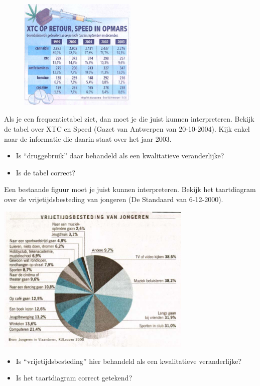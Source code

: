 \documentclass[12pt,twoside]{article}
\begin{document}
\begin{figure}
  \vspace*{-1.5cm}
  \centering
  \includegraphics[width=0.5\textwidth]{tabel-drugs}
\end{figure}
\vspace*{1cm}
Als je een frequentietabel ziet, dan moet je die juist kunnen interpreteren. Bekijk de tabel over XTC en Speed (Gazet van Antwerpen van 20-10-2004). Kijk enkel naar de informatie die daarin staat over het jaar 2003.

\begin{oefening}
\begin{itemize}
  \item Is “druggebruik” daar behandeld als een kwalitatieve veranderlijke?
  \item Is de tabel correct?
\end{itemize}
\end{oefening}

\begin{oefening}
Een bestaande figuur moet je juist kunnen interpreteren. Bekijk het taartdiagram over de
vrijetijdsbesteding van jongeren (De Standaard van 6-12-2000).

\begin{center}
  \includegraphics[width=0.7\textwidth]{cirkeldiagram-vrijetijdsbesteding}
\end{center}

\begin{itemize}
  \item Is “vrijetijdsbesteding” hier behandeld als een kwalitatieve veranderlijke?
  \item Is het taartdiagram correct getekend?
\end{itemize}
\end{oefening}
\end{document}
